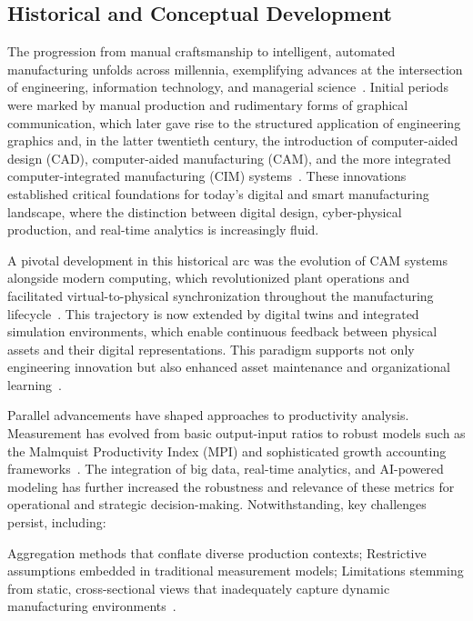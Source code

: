 \documentclass[sigconf]{acmart}
\begin{document}
\subsection{Historical and Conceptual Development}

The progression from manual craftsmanship to intelligent, automated manufacturing unfolds across millennia, exemplifying advances at the intersection of engineering, information technology, and managerial science~\cite{ref50,ref54,ref62,ref63,ref67,ref86}. Initial periods were marked by manual production and rudimentary forms of graphical communication, which later gave rise to the structured application of engineering graphics and, in the latter twentieth century, the introduction of computer-aided design (CAD), computer-aided manufacturing (CAM), and the more integrated computer-integrated manufacturing (CIM) systems~\cite{ref50,ref54}. These innovations established critical foundations for today's digital and smart manufacturing landscape, where the distinction between digital design, cyber-physical production, and real-time analytics is increasingly fluid.

A pivotal development in this historical arc was the evolution of CAM systems alongside modern computing, which revolutionized plant operations and facilitated virtual-to-physical synchronization throughout the manufacturing lifecycle~\cite{ref54}. This trajectory is now extended by digital twins and integrated simulation environments, which enable continuous feedback between physical assets and their digital representations. This paradigm supports not only engineering innovation but also enhanced asset maintenance and organizational learning~\cite{ref67}.

Parallel advancements have shaped approaches to productivity analysis. Measurement has evolved from basic output-input ratios to robust models such as the Malmquist Productivity Index (MPI) and sophisticated growth accounting frameworks~\cite{ref86}. The integration of big data, real-time analytics, and AI-powered modeling has further increased the robustness and relevance of these metrics for operational and strategic decision-making. Notwithstanding, key challenges persist, including:

Aggregation methods that conflate diverse production contexts;
Restrictive assumptions embedded in traditional measurement models;
Limitations stemming from static, cross-sectional views that inadequately capture dynamic manufacturing environments~\cite{ref86}.
\end{document}
